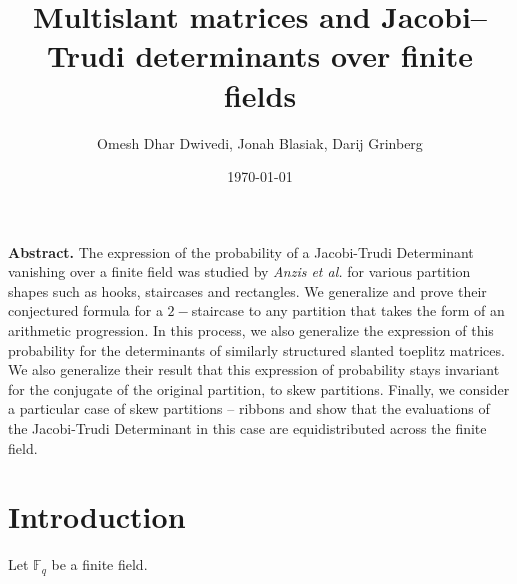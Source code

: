 \documentclass[numbers=enddot,12pt,final,onecolumn,notitlepage]{scrartcl}%
\theoremstyle{definition}
\theoremstyle{plainsl}
\begin{document}
\title{Multislant matrices and Jacobi--Trudi determinants over finite fields}
\author{Omesh Dhar Dwivedi, Jonah Blasiak, Darij Grinberg}
\date{
\today
}
\maketitle

\textbf{Abstract.}
The expression of the probability of a Jacobi-Trudi Determinant vanishing over a finite field was studied by \emph{Anzis et al.} for various partition shapes such as hooks, staircases and rectangles. We generalize and prove their conjectured formula for a $2-$staircase to any partition that takes the form of an arithmetic progression. In this process, we also generalize the expression of this probability for the determinants of similarly structured slanted toeplitz matrices.  We also generalize their result that this expression of probability stays invariant for the conjugate of the original partition, to skew partitions. Finally, we consider a particular case of skew partitions -- ribbons and show that the evaluations of the Jacobi-Trudi Determinant in this case are equidistributed across the finite field.

\section{\label{sec.introduction}Introduction}

Let $\mathbb{F}_q$ be a finite field.
\end{document}
